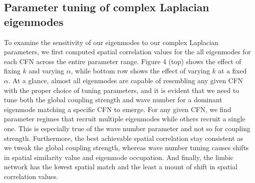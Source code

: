 \documentclass{article}
\begin{document}
\subsection{Parameter tuning of complex Laplacian eigenmodes}
To examine the sensitivity of our eigenmodes to our complex Laplacian parameters, we first computed spatial correlation values for the all eigenmodes for each CFN across the entire parameter range. Figure 4 (top) shows the effect of fixing $k$ and varying $\alpha$, while bottom row shows the effect of varying $k$ at a fixed $\alpha$. At a glance, almost all eigenmodes are capable of resembling any given CFN with the proper choice of tuning parameters, and it is evident that we need to tune both the global coupling strength and wave number for a dominant eigenmode matching a specific CFN to emerge. For any given CFN, we find parameter regimes that recruit multiple eigenmodes while others recruit a single one. This is especially true of the wave number parameter and not so for coupling strength. Furthermore, the best achievable spatial correlation stay consistent as we tweak the global coupling strength, whereas wave number tuning causes shifts in spatial similarity value and eigenmode occupation. And finally, the limbic network has the lowest spatial  match  and the least a mount of shift in spatial correlation values.


\end{document}
